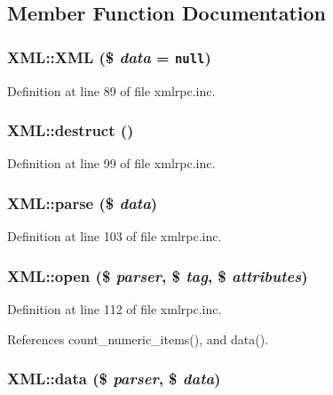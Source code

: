 \subsection{Member Function Documentation}
\hypertarget{classXML_1475a1374023931e2227277f4047c9aa}{
\subsubsection{\setlength{\rightskip}{0pt plus 5cm}XML::XML (\$ {\em data} = {\tt null})}}
\label{classXML_1475a1374023931e2227277f4047c9aa}




Definition at line 89 of file xmlrpc.inc.\hypertarget{classXML_d1524d80c783b2cd22966462411b9b7d}{
\subsubsection{\setlength{\rightskip}{0pt plus 5cm}XML::destruct ()}}
\label{classXML_d1524d80c783b2cd22966462411b9b7d}




Definition at line 99 of file xmlrpc.inc.\hypertarget{classXML_61e6258dc3d5750100e1f0dd08d6334a}{
\subsubsection{\setlength{\rightskip}{0pt plus 5cm}XML::parse (\$ {\em data})}}
\label{classXML_61e6258dc3d5750100e1f0dd08d6334a}




Definition at line 103 of file xmlrpc.inc.\hypertarget{classXML_eac7eae74d866d4f5a0cdb9be27ff279}{
\subsubsection{\setlength{\rightskip}{0pt plus 5cm}XML::open (\$ {\em parser}, \$ {\em tag}, \$ {\em attributes})}}
\label{classXML_eac7eae74d866d4f5a0cdb9be27ff279}




Definition at line 112 of file xmlrpc.inc.

References count\_\-numeric\_\-items(), and data().\hypertarget{classXML_ca70dfbd3e8ce956075181701b09b033}{
\subsubsection{\setlength{\rightskip}{0pt plus 5cm}XML::data (\$ {\em parser}, \$ {\em data})}}
\label{classXML_ca70dfbd3e8ce956075181701b09b033}




